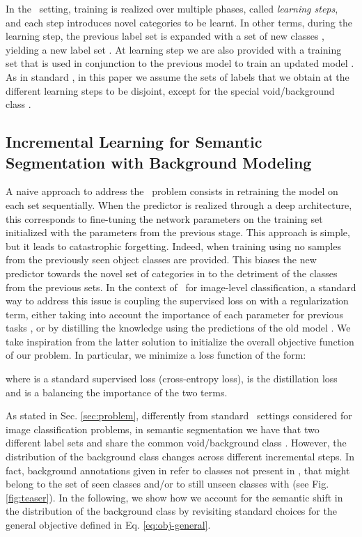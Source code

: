 In the \icl\ setting, training is realized over multiple phases, called \textit{learning steps}, and each step introduces novel categories to be learnt. In other terms, during the  learning step, the previous label set  is expanded with a set of new {classes} , yielding a new label set .
At learning step  we are also provided with a training set  that is used in conjunction to the previous model  to train an updated model .
As in standard \icl, in this paper we assume the sets of labels  that we obtain at the different learning steps to be disjoint, except for the special void/background class . 











\subsection{Incremental Learning for Semantic Segmentation with Background Modeling}
\label{sec:our-method}
A naive approach to address the \icl\ problem consists in retraining the model  on each set  sequentially. When the predictor  is realized through a deep architecture, this corresponds to fine-tuning the network parameters on the training set  initialized with the parameters  from the previous stage. This approach is simple, but it leads to catastrophic forgetting. Indeed, when training using  no samples from the previously seen object classes are provided. This biases the new predictor  towards the novel set of categories in  to the detriment of the classes from the previous sets. In the context of \icl\ for image-level classification, a standard way to address this issue is coupling the supervised loss on  with a regularization term, either taking into account the importance of each parameter for previous tasks \cite{kirkpatrick2017overcoming,shin2017continual}, or by distilling the knowledge using the predictions of the old model  \cite{li2017learning,rebuffi2017icarl,castro2018end}. We take inspiration from the latter solution to initialize the overall objective function of our problem. In particular, we  minimize a loss function of the form:

where  is a standard supervised loss (\eg cross-entropy loss),  is the distillation loss and  is a \hyper balancing the importance of the two terms. 


As stated in Sec. \ref{sec:problem}, differently from standard \icl\ settings considered for image classification problems, in semantic segmentation we have that two different label sets  and   share the common void/background class . However, {the distribution of the background class} changes across different incremental steps. In fact, background annotations given in  refer to classes not present in , that might belong to the set of seen classes  and/or to still unseen classes \ie  with   (see Fig. \ref{fig:teaser}). In the following, we show how we account for the semantic shift in the distribution of the background class by revisiting standard choices for the general objective defined in Eq. \eqref{eq:obj-general}. 


